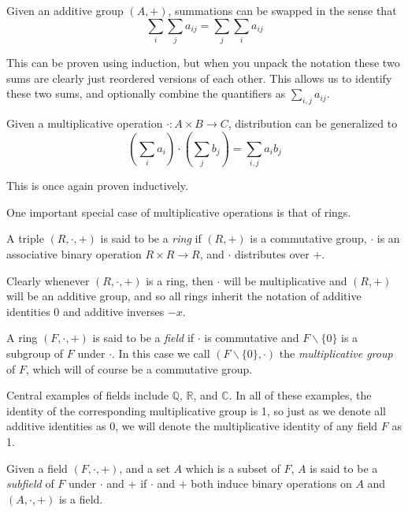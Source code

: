 \begin{prop}Given an additive group $(A, +)$, summations can be swapped in the sense that
	\[\sum_i\sum_j a_{ij} = \sum_j\sum_i a_{ij}\]
\end{prop}
This can be proven using induction, but when you unpack the notation these two sums are clearly just reordered versions of each other. This allows us to identify these two sums, and optionally combine the quantifiers as $\sum_{i,j} a_{ij}$.

\begin{prop}Given a multiplicative operation $\cdot: A \times B \to C$, distribution can be generalized to
\[(\sum_i a_i)\cdot (\sum_j b_j) = \sum_{i,j} a_ib_j\]
\end{prop}
This is once again proven inductively.

One important special case of multiplicative operations is that of rings.
\begin{define}[Rings] A triple $(R, \cdot, +)$ is said to be a \emph{ring} if $(R, +)$ is a commutative group, $\cdot$ is an associative binary operation $R \times R \to R$, and $\cdot$ distributes over $+$.
\end{define}
Clearly whenever $(R, \cdot, +)$ is a ring, then $\cdot$ will be multiplicative and $(R, +)$ will be an additive group, and so all rings inherit the notation of additive identities 0 and additive inverses $-x$.

\begin{define} A ring $(F, \cdot, +)$ is said to be a \emph{field} if $\cdot$ is commutative and $F \backslash \{0\}$ is a subgroup of $F$ under $\cdot$. In this case we call $(F\backslash\{0\}, \cdot)$ the \emph{multiplicative group} of $F$, which will of course be a commutative group.
\end{define}

Central examples of fields include $\mathbb{Q}$, $\mathbb{R}$, and $\mathbb{C}$. In all of these examples, the identity of the corresponding multiplicative group is 1, so just as we denote all additive identities as 0, we will denote the multiplicative identity of any field $F$ as 1.

\begin{define}[Subfield] Given a field $(F, \cdot, +)$, and a set $A$ which is a subset of $F$, $A$ is said to be a \emph{subfield} of $F$ under $\cdot$ and $+$ if $\cdot$ and $+$ both induce binary operations on $A$ and $(A, \cdot, +)$ is a field.
\end{define}

